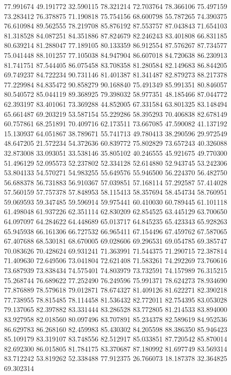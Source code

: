 77.991674
49.191772
32.590115
78.321214
72.703764
78.366106
75.497159
73.283412
76.378875
71.190818
75.754156
68.600798
55.787265
74.390375
76.610984
89.562555
78.219708
85.876192
87.553757
87.043843
71.654103
81.318528
84.087251
84.351886
87.824679
82.246243
83.401808
66.831185
80.639214
81.288047
77.189105
80.133359
86.912554
87.576267
87.734577
75.041448
88.101257
77.105038
84.947904
86.607018
84.720638
86.230913
81.741751
87.544405
86.075458
83.708358
81.280584
82.149683
86.844205
69.749237
84.722234
90.731146
81.401387
81.341487
82.879273
88.217378
77.229984
84.835472
90.858279
90.168840
75.491349
85.991351
80.846057
80.540572
85.044119
89.368925
79.398032
58.977351
48.185466
87.044772
62.393197
83.401061
73.369288
44.852005
67.331584
63.801325
83.148494
65.661487
69.203219
53.587154
55.229286
58.395293
70.406838
82.678149
60.757861
68.251891
70.409716
62.173511
73.667085
47.590082
41.137192
15.130937
64.051867
38.789671
55.741713
49.780413
38.290596
29.972549
48.647205
21.572234
54.372636
60.839772
75.802829
73.657243
40.326088
32.873008
33.093051
33.538146
35.805102
40.246555
45.921675
49.770300
51.496129
52.095573
52.237802
52.334128
52.614880
52.943745
53.242306
53.804133
54.570271
54.983255
55.649576
55.946500
56.224370
56.482750
56.688378
56.731883
56.910367
57.039851
57.168114
57.292587
57.414028
57.560159
57.757378
57.848953
58.115413
58.357694
58.454734
58.760951
59.069593
59.347485
59.596914
59.975441
60.410030
60.789445
61.101118
61.498048
61.937226
62.351114
62.830209
62.854525
63.445129
63.700650
64.097097
64.284622
64.448689
65.013717
64.845235
65.423343
65.928263
65.945938
66.161306
66.727532
66.965411
67.154496
67.459762
67.587065
67.407688
68.530181
68.670005
69.028606
69.296531
69.054785
69.385747
70.083626
70.428624
69.931241
71.363991
71.544375
71.290715
72.387814
71.409630
72.649506
73.041804
72.621408
71.583261
74.292269
73.760616
73.687939
73.838434
74.575401
74.803979
73.732591
74.157989
76.315215
75.268744
76.689622
77.252490
76.249596
75.991371
78.624273
78.934690
77.876889
78.579618
79.012871
78.674327
81.409126
81.622271
82.390218
77.738955
78.815485
78.114458
81.536432
82.772011
82.754395
83.053028
79.137065
82.397882
83.331444
83.286528
83.772805
81.214533
83.894000
83.927958
82.018560
80.097496
83.707891
85.234378
82.589619
84.952536
86.629783
86.268160
82.459983
85.430302
84.205598
88.386350
85.946423
85.109179
83.319107
83.748556
82.512917
85.033851
87.720542
85.870014
82.692300
86.015805
81.784175
83.370687
87.180992
81.697749
83.569314
83.712242
53.819262
52.338488
77.912375
26.766073
18.187378
32.364825
69.302314

